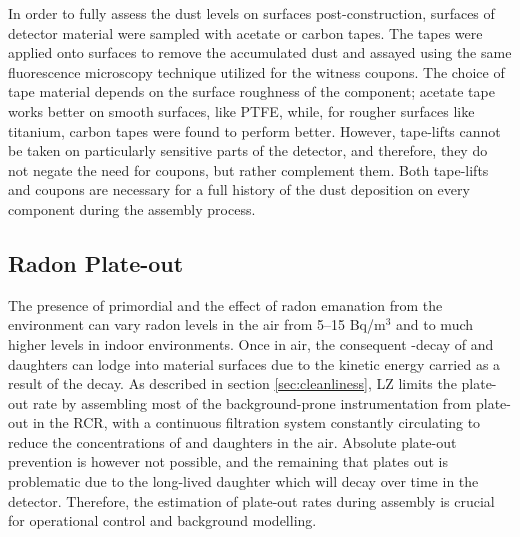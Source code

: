 In order to fully assess the dust levels on surfaces post-construction, surfaces of detector material were sampled with acetate or carbon tapes. The tapes were applied onto surfaces to remove the accumulated dust and assayed using the same fluorescence microscopy technique utilized for the witness coupons. The choice of tape material depends on the surface roughness of the component; acetate tape works better on smooth surfaces, like PTFE, while, for rougher surfaces like titanium, carbon tapes were found to perform better. However, tape-lifts cannot be taken on particularly sensitive parts of the detector, and therefore, they do not negate the need for coupons, but rather complement them. Both tape-lifts and coupons are necessary for a full history of the dust deposition on every component during the assembly process. 


\subsection{Radon Plate-out}
\label{secsec:radon_plateout}

The presence of primordial \UTTE{} and the effect of radon emanation from the environment can vary radon levels in the air from 5--15 Bq/m$^3$ and to much higher levels in indoor environments. Once in air, the consequent \alpha-decay of \RnTTT{} and daughters can lodge into material surfaces due to the kinetic energy carried as a result of the decay. As described in section \ref{sec:cleanliness}, LZ limits the plate-out rate by assembling most of the background-prone instrumentation from plate-out in the RCR, with a continuous filtration system constantly circulating to reduce the concentrations of \RnTTT{} and daughters in the air. Absolute plate-out prevention is however not possible, and the remaining \PoTOE{} that plates out is problematic due to the long-lived \PbTOZ{} daughter which will decay over time in the detector. Therefore, the estimation of plate-out rates during assembly is crucial for operational control and background modelling.

